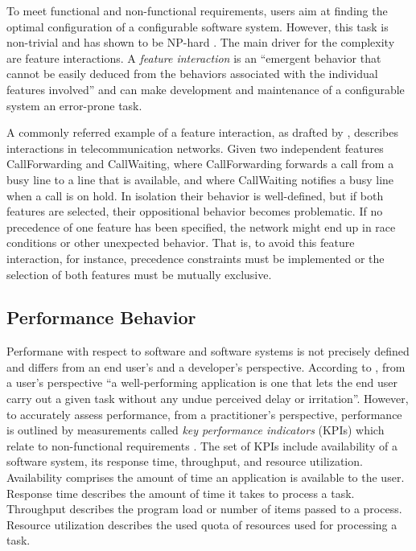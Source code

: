 To meet functional and non-functional requirements, users aim at finding the
optimal configuration of a configurable software system. However, this task is
non-trivial and has shown to be NP-hard \citep{white_selecting_2009}. The main
driver for the complexity are feature interactions. A \emph{feature
interaction} is an ``emergent behavior that cannot be easily deduced from the
behaviors associated with the individual features involved''
\citep{apel_feature-oriented_2013} and can make development and maintenance of
a configurable system an error-prone task.

{\color{red}
A commonly referred example of a feature interaction, as drafted by
\cite{calder_feature_2003}, describes interactions in telecommunication networks. 
Given two independent features \textsf{CallForwarding} and
\textsf{CallWaiting}, where \textsf{CallForwarding} forwards a call from a busy
line to a line that is available, and where \textsf{CallWaiting} notifies a
busy line when a call is on hold. In isolation their behavior is well-defined,
but if both features are selected, their oppositional behavior becomes
problematic. If no precedence of one feature has been specified, the network
might end up in race conditions or other unexpected behavior. That is, to avoid
this feature interaction, for instance, precedence constraints must be
implemented or the selection of both features must be mutually exclusive.}

\subsection{Performance Behavior}
Performane with respect to software and software systems is not
precisely defined and differs from an end user's and a developer’s perspective.
According to \cite{molyneaux_art_2014}, from a user’s perspective ``a well-performing
application is one that lets the end user carry out a given task without any
undue perceived delay or irritation''. However, to accurately assess
performance, from a practitioner’s perspective, performance is outlined by
measurements called \emph{key performance indicators} (KPIs) which relate to
non-functional requirements \citep{molyneaux_art_2014}. The set of KPIs include
availability of a software system, its response time, throughput, and resource
utilization. Availability comprises the amount of time an application is
available to the user. Response time describes the amount of time it takes to
process a task. Throughput describes the program load or number of items passed
to a process. Resource utilization describes the used quota of resources used
for processing a task.

